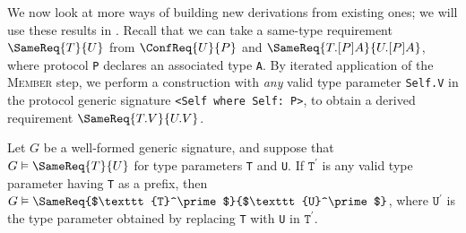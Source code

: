 \documentclass[../generics]{subfiles}
\begin{document}
We now look at more ways of building new derivations from existing ones; we will use these results in . Recall that we can take a same-type requirement $\SameReq{T}{U}$ from $\ConfReq{U}{P}$ and $\SameReq{T.[P]A}{U.[P]A}$, where protocol \texttt{P} declares an associated type \texttt{A}. By iterated application of the \textsc{Member} step, we perform a construction with \emph{any} valid type parameter \texttt{Self.V} in the protocol generic signature \verb|<Self where Self: P>|, to obtain a derived requirement $\SameReq{T.V}{U.V}$.

\begin{lemma}\label{general member type}
Let $G$ be a well-formed generic signature, and suppose that $G\vDash\SameReq{T}{U}$ for type parameters \texttt{T} and \texttt{U}. If $\texttt{T}^\prime$ is any valid type parameter having \texttt{T} as a prefix, then $G\vDash\SameReq{$\texttt{T}^\prime$}{$\texttt{U}^\prime$}$, where $\texttt{U}^\prime$ is the type parameter obtained by replacing \texttt{T} with \texttt{U} in $\texttt{T}^\prime$.
\end{lemma}
\end{document}
